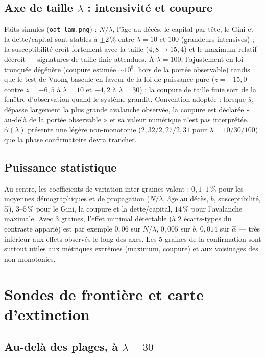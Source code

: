 \documentclass[11pt,a4paper]{article}
\newcommand{\code}[1]{\texttt{#1}}
\begin{document}
\subsection{Axe de taille $\lambda$ : intensivité et coupure}

Faits simulés (\code{oat\_lam.png}) : $N/\lambda$, l'âge au décès, le
capital par tête, le Gini et la dette/capital sont stables à
$\pm2\,\%$ entre $\lambda=10$ et $100$ (grandeurs intensives) ; la
susceptibilité croît fortement avec la taille ($4{,}8\to15{,}4$) et le
maximum relatif décroît — signatures de taille finie attendues. À
$\lambda=100$, l'ajustement en loi tronquée dégénère (coupure estimée
$\sim10^8$, hors de la portée observable) tandis que le test de Vuong
bascule en faveur de la loi de puissance pure ($z=+15{,}0$ contre
$z=-6{,}5$ à $\lambda=10$ et $-4{,}2$ à $\lambda=30$) : la coupure de
taille finie sort de la fenêtre d'observation quand le système grandit.
Convention adoptée : lorsque $\hat s_c$ dépasse largement la plus grande
avalanche observée, la coupure est déclarée « au-delà de la portée
observable » et sa valeur numérique n'est pas interprétée.
$\hat\alpha(\lambda)$ présente une légère non-monotonie
($2{,}32/2{,}27/2{,}31$ pour $\lambda=10/30/100$) que la phase
confirmatoire devra trancher.

\subsection{Puissance statistique}

Au centre, les coefficients de variation inter-graines valent :
$0{,}1$--$1\,\%$ pour les moyennes démographiques et de propagation
($N/\lambda$, âge au décès, $b$, susceptibilité, $\hat\alpha$),
$3$--$5\,\%$ pour le Gini, la coupure et la dette/capital, $14\,\%$ pour
l'avalanche maximale. Avec 3 graines, l'effet minimal détectable
(à $2$ écarts-types du contraste apparié) est par exemple $0{,}06$ sur
$N/\lambda$, $0{,}005$ sur $b$, $0{,}014$ sur $\hat\alpha$ — très
inférieur aux effets observés le long des axes. Les 5 graines de la
confirmation sont surtout utiles aux métriques extrêmes (maximum,
coupure) et aux voisinages des non-monotonies.

\section{Sondes de frontière et carte d'extinction}
\label{sec:frontiere}

\subsection{Au-delà des plages, à $\lambda=30$}
\end{document}
